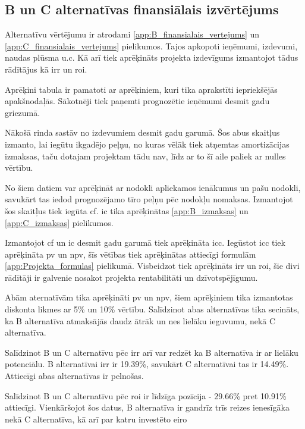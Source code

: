 \subsection{B un C alternatīvas finansiālais izvērtējums}
Alternatīvu vērtējumu ir atrodami \ref{app:B_finansialais_vertejums} un \ref{app:C_finansialais_vertejums} pielikumos.
Tajos apkopoti ieņēmumi, izdevumi, naudas plūsma u.c. Kā arī tiek aprēķināts projekta izdevīgums izmantojot
tādus rādītājus kā \gls{irr} un \gls{roi}.
\par
Aprēķini tabula ir pamatoti ar aprēķiniem, kuri tika aprakstīti iepriekšējās apakšnodaļās. Sākotnēji
tiek paņemti prognozētie ieņēmumi desmit gadu griezumā.
\par 
Nākošā rinda sastāv no izdevumiem desmit gadu garumā. Šos abus skaitļus izmanto, lai iegūtu ikgadējo 
peļņu, no kuras vēlāk tiek atņemtas amortizācijas izmaksas, taču dotajam projektam tādu nav, līdz 
ar to šī aile paliek ar nulles vērtību.
\par 
No šiem datiem var aprēķināt ar nodokli apliekamos ienākumus un pašu nodokli, savukārt tas iedod
prognozējamo tīro peļņu pēc nodokļu nomaksas. Izmantojot šos skaitļus tiek iegūta \gls{cf}. \Gls{ic} tika aprēķinātas 
\ref{app:B_izmaksas} un \ref{app:C_izmaksas} pielikumos. 
\par
Izmantojot \acrshort{cf} un \acrshort{ic} desmit gadu garumā tiek aprēķināta \gls{icc}. Iegūstot \acrshort{icc} 
tiek aprēķināta \gls{pv} un \gls{npv}, šīs vētības tiek aprēķinātas attiecīgi formulām \ref{app:Projekta_formulas}
pielikumā. Visbeidzot tiek aprēķināts \acrshort{irr} un \acrshort{roi}, šie divi rādītāji ir galvenie nosakot 
projekta rentabilitāti un dzīvotspējīgumu.
\par
Abām aternatīvām tika aprēķināti \acrshort{pv} un \acrshort{npv}, šiem aprēķiniem tika izmantotas diskonta
likmes ar 5\% un 10\% vērtību. Salīdzinot abas alternatīvas tika secināts, ka B alternatīva atmaksājās daudz
ātrāk un nes lielāku ieguvumu, nekā C alternatīva. 
\par
Salīdzinot B un C alternatīvu pēc \gls{irr} arī var redzēt ka B alternatīva ir ar lielāku potenciālu.
B alternatīvai \gls{irr} ir 19.39\%, savukārt C alternatīvai tas ir 14.49\%. Attiecīgi abas alternatīvas ir
pelnošas.
\par
Salīdzinot B un C alternatīvu pēc \gls{roi} ir līdzīga pozīcija - 29.66\% pret 10.91\% attiecīgi. Vienkāršojot
šos datus, B alternatīva ir gandrīz trīs reizes ienesīgāka nekā C alternatīva, kā arī par katru investēto eiro
